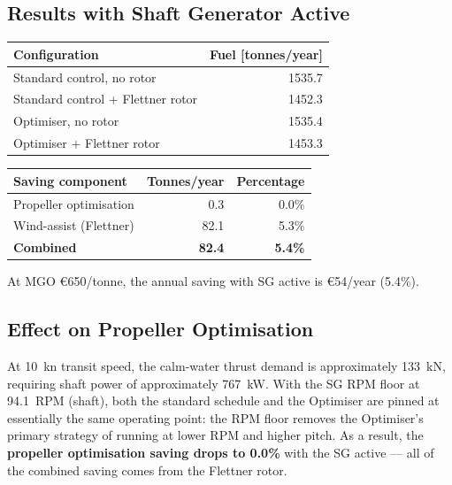 \documentclass[a4paper,11pt]{article}
\begin{document}
\subsection{Results with Shaft Generator Active}
\label{sec:org0fb938e}

\begin{center}
\begin{tabular}{lr}
\toprule
Configuration & Fuel [tonnes/year]\\[0pt]
\midrule
Standard control, no rotor & 1535.7\\[0pt]
Standard control + Flettner rotor & 1452.3\\[0pt]
Optimiser, no rotor & 1535.4\\[0pt]
Optimiser + Flettner rotor & 1453.3\\[0pt]
\bottomrule
\end{tabular}
\end{center}

\begin{center}
\begin{tabular}{lrr}
\toprule
Saving component & Tonnes/year & Percentage\\[0pt]
\midrule
Propeller optimisation & 0.3 & 0.0\%\\[0pt]
Wind-assist (Flettner) & 82.1 & 5.3\%\\[0pt]
\textbf{Combined} & \textbf{82.4} & \textbf{5.4\%}\\[0pt]
\bottomrule
\end{tabular}
\end{center}

At MGO \euro650/tonne, the annual saving with SG active is
\euro54/year (5.4\%).

\subsection{Effect on Propeller Optimisation}
\label{sec:org7e36a69}

At \SI{10}{\knot} transit speed, the calm-water thrust demand is approximately
\SI{133}{\kilo\newton}, requiring shaft power of approximately \SI{767}{\kilo\watt}.
With the SG RPM floor at \SI{94.1}{RPM} (shaft), both the standard schedule and
the Optimiser are pinned at essentially the same operating point: the RPM floor
removes the Optimiser's primary strategy of running at lower RPM and higher
pitch.  As a result, the \textbf{propeller optimisation saving drops to
0.0\%} with the SG active --- all of the combined saving comes from
the Flettner rotor.
\end{document}
